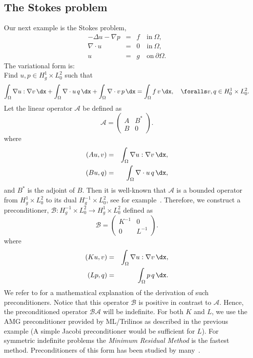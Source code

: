 \subsection{The Stokes problem}
Our next example is the Stokes problem,
\begin{eqnarray}
-\Delta u - \nabla p &=& f \quad \mbox{in} \ \Omega, \\
\nabla \cdot u &=& 0 \quad \mbox{in} \  \Omega, \\
             u &=& g   \quad \mbox{on} \  \partial \Omega.
\end{eqnarray}
The variational form is: \\
Find $u,p \in H^1_g \times L_0^2$ such that
\[
\int_\Omega \nabla u : \nabla v \,  \dx +
\int_\Omega \nabla \cdot u \, q \,  \dx +
\int_\Omega \nabla \cdot v \, p \,  \dx = \int_\Omega f\, v\, \dx   , \quad
\foralls v,q \in H^1_0 \times L_0^2.
\]
Let the linear operator $\mathcal{A}$ be defined as
\[
\mathcal{A}  =
\begin{pmatrix} A & B^* \\ B & 0 \end{pmatrix}.
\]
where
\begin{eqnarray}
(A u, v) &=& \int_\Omega \nabla u : \nabla v \,  \dx, \\
(B u, q) &=& \int_\Omega \nabla \cdot u \, q \,  \dx,
\end{eqnarray}
and $B^*$ is the adjoint of $B$.  Then it is well-known that
$\mathcal{A}$ is a bounded operator from $H^1_g \times L_0^2$ to its
dual $H_g^{-1} \times L_0^2$, see for
example~\citet{Brezzi1974,BrezziFortin1991}. Therefore, we construct a
preconditioner, $\mathcal{B}: H_g^{-1} \times L_0^2 \rightarrow
H^1_g \times L_0^2$ defined as
\[
\mathcal{B}
=
\begin{pmatrix} K^{-1} & 0 \\ 0 & L^{-1} \end{pmatrix}.
\]
where
\begin{eqnarray}
(K u, v) &=& \int_\Omega \nabla u: \nabla v \, \dx, \\
(L p, q) &=& \int_\Omega p \, q \, \dx .
\end{eqnarray}
We refer to \citet{MardalWinther11} for a mathematical explanation of
the derivation of such preconditioners.  Notice that this operator
$\mathcal{B}$ is positive in contrast to $\mathcal{A}$. Hence, the
preconditioned operator $\mathcal{B} \mathcal{A}$ will be
indefinite. For both $K$ and $L$, we use the AMG preconditioner
provided by ML/Trilinos as described in the previous example (A simple
Jacobi preconditioner would be sufficient for $L$).  For symmetric
indefinite problems the \emph{Minimum Residual Method} is the fastest
method. Preconditioners of this form has been studied by
many~\citep{ElmanSilvesterWathen2005,RustenWinther1992,SilvesterWathen1993,SilvesterWathen1994}.

